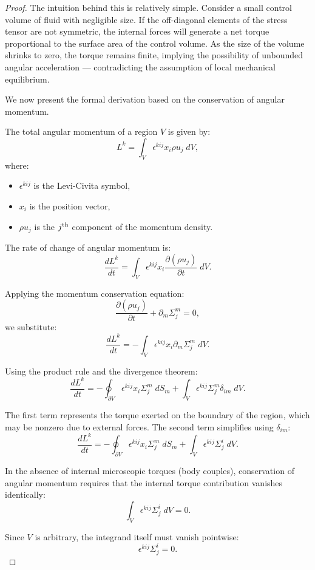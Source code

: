 \begin{proof}
The intuition behind this is relatively simple. Consider a small control volume of fluid with negligible size. If the off-diagonal elements of the stress tensor are not symmetric, the internal forces will generate a net torque proportional to the surface area of the control volume. As the size of the volume shrinks to zero, the torque remains finite, implying the possibility of unbounded angular acceleration — contradicting the assumption of local mechanical equilibrium.

We now present the formal derivation based on the conservation of angular momentum.

The total angular momentum of a region $V$ is given by:
\[
L^k = \int_V \epsilon^{kij} x_i \rho u_j \; dV,
\]
where:
\begin{itemize}
    \item $\epsilon^{kij}$ is the Levi-Civita symbol,
    \item $x_i$ is the position vector,
    \item $\rho u_j$ is the $j^{\rm th}$ component of the momentum density.
\end{itemize}

The rate of change of angular momentum is:
\[
\frac{d L^k}{dt} = \int_V \epsilon^{kij} x_i \frac{\partial (\rho u_j)}{\partial t} \; dV.
\]

Applying the momentum conservation equation:
\[
\frac{\partial (\rho u_j)}{\partial t} + \partial_m \Sigma^m_j = 0,
\]
we substitute:
\[
\frac{d L^k}{dt} = - \int_V \epsilon^{kij} x_i \partial_m \Sigma^m_j \; dV.
\]

Using the product rule and the divergence theorem:
\[
\frac{d L^k}{dt} = - \oint_{\partial V} \epsilon^{kij} x_i \Sigma^m_j \; dS_m + \int_V \epsilon^{kij} \Sigma^m_j \delta_{im} \; dV.
\]

The first term represents the torque exerted on the boundary of the region, which may be nonzero due to external forces. The second term simplifies using $\delta_{im}$:
\[
\frac{d L^k}{dt} = - \oint_{\partial V} \epsilon^{kij} x_i \Sigma^m_j \; dS_m + \int_V \epsilon^{kij} \Sigma^i_j \; dV.
\]

In the absence of internal microscopic torques (body couples), conservation of angular momentum requires that the internal torque contribution vanishes identically:
\[
\int_V \epsilon^{kij} \Sigma^i_j \; dV = 0.
\]

Since $V$ is arbitrary, the integrand itself must vanish pointwise:
\[
\epsilon^{kij} \Sigma^i_j = 0.
\]


\end{proof}
